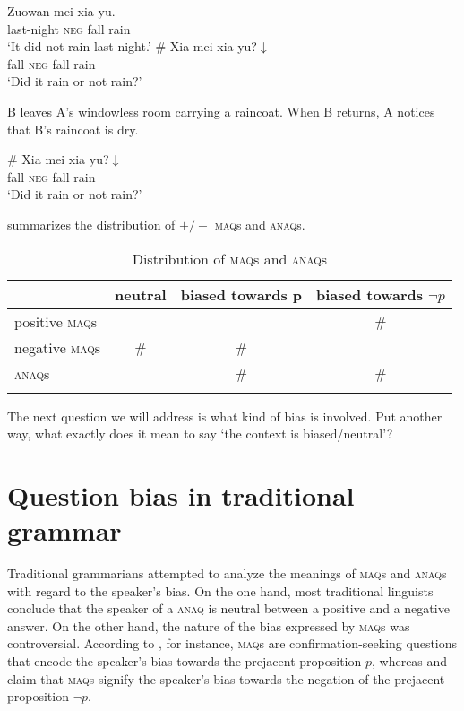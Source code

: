 \documentclass[output=paper,colorlinks,citecolor=brown]{langscibook}
\begin{document}
	\begin{exe}
	\ex\label{negnonv2}
\begin{xlist}
\gll Zuowan mei xia yu. \\
	last-night \textsc{neg} fall rain \\
\glt `It did not rain last night.'
\#\gll
	Xia mei xia yu?$\downarrow$\\
    fall \textsc{neg} fall rain\\
\glt `Did it rain or not rain?'  
\end{xlist}
\ex\label{1qing2} B leaves A's  windowless  room carrying a raincoat. When B returns, A notices that B's raincoat is dry.
\begin{xlist}
\#\gll
	Xia mei xia yu?$\downarrow$\\
    fall \textsc{neg} fall rain\\
\glt `Did it rain or not rain?' 
\end{xlist}
\end{exe}
	
 summarizes the distribution of $+/-$ \textsc{maq}s and 	\textsc{anaq}s.

\begin{table}
\begin{tabularx}{\textwidth}{lCCc}
\lsptoprule
	&  neutral  & biased towards  p & biased towards $\neg p$\\
	\midrule
	positive \textsc{maq}s & \cmark & \cmark & \#\\
	negative \textsc{maq}s & \# & \# & \cmark\\
	\textsc{anaq}s & \cmark & \# & \#\\
	\lspbottomrule
\end{tabularx}
\caption{Distribution of \textsc{maq}s and 	\textsc{anaq}s} 
\label{tab:maq:anaq}
\end{table}	

The next question we will address is what kind of bias is involved. Put another way, what exactly does it mean to say `the context is biased/neutral'?




\section{Question bias in traditional grammar}


Traditional grammarians attempted to analyze  the meanings of \textsc{maq}s and \textsc{anaq}s with regard to the speaker's bias.
On the one hand, most traditional linguists  conclude that  the speaker of a \textsc{anaq} is neutral between a positive and a negative answer. On the other hand,  the nature  of the bias expressed by \textsc{maq}s  was controversial.   According to \citet[168]{Wangli1943}, for instance,   \textsc{maq}s are confirmation-seeking questions that encode the speaker's bias towards the prejacent proposition $p$, whereas \citet[356]{Chaospoken1968} and \citet[72]{Shao} claim that  \textsc{maq}s signify the speaker's bias towards the negation of the    prejacent proposition $\neg p$.  
\end{document}
